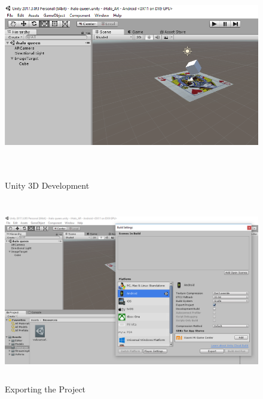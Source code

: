 \begin{figure}[H]
	
	\centering
	\includegraphics[width=\linewidth,height=9cm] {./images/p26.png}
	\caption{Unity 3D Development}
	\label{manual}
\end{figure}

\begin{figure}[H]
	
	\centering
	\includegraphics[width=\linewidth,height=8cm] {./images/p27.png}
	\caption{Exporting the Project}
	\label{manual}
\end{figure}

